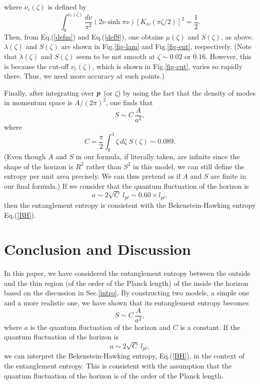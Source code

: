 where $\nu_c(\zeta)$ is defined by
\begin{equation}
\int^{\nu_c(\zeta)}_0 \frac{d\nu}{\pi^2}(2\nu\sinh\pi\nu) 
    \left[K_{i\nu}(\pi\zeta/2)\right]^2=\frac{1}{2}.
\end{equation}
Then, from Eq.(\ref{defm}) and Eq.(\ref{defS}),
one obtains $\mu(\zeta)$ and $S(\zeta)$, as above.
$\lambda(\zeta)$ and $S(\zeta)$
are shown in Fig.\ref{fig-lam} and Fig.\ref{fig-ent},
respectively.
(Note that $\lambda(\zeta)$ and $S(\zeta)$
seem to be not smooth at $\zeta\sim0.02$ or $0.16$.
However, this is because the cut-off $\nu_c(\zeta)$,
which is shown in Fig.\ref{fig-cut}, varies
so rapidly there.
Thus, we need more accuracy at such points.)

Finally, after integrating over $\mbox{\boldmath $p$}$ (or $\zeta$)
by using the fact that the density of modes in
momentum space is $A/(2\pi)^2$,
one finds that
\begin{equation}
  S\sim C\,\frac{A}{a^2},
\end{equation}
where
\begin{equation}
  C=\frac{\pi}{2}\int^1_0 
    \zeta\, d\zeta \;S(\zeta)\sim 0.089.
\end{equation}
(Even though $A$ and $S$ in our formula,
if literally taken, are infinite since
the shape of the horizon is $R^2$ rather than
$S^2$ in this model, we can still define the
entropy per unit area precisely.
We can thus pretend as if $A$ and $S$ are finite
in our final formula.)
If we consider that the quantum fluctuation of the horizon is
\begin{equation}
  a \sim 2\sqrt{C}\; l_{pl} \sim 0.60 \times l_{pl} ,
\end{equation}
then the entanglement entropy is consistent with 
the Bekenstein-Hawking entropy Eq.(\ref{BH}).

\section{Conclusion and Discussion}
\label{conclude}
In this paper, we have considered
the entanglement entropy between
the outside and the thin region
(of the order of the Planck length)
of the inside the horizon
based on the discussion in Sec.\ref{intro}.
By constructing two models, a simple one and a more realistic one,
we have shown that its entanglement entropy becomes
\begin{equation}
 S\sim C\,\frac{A}{a^2},
\end{equation}
where $a$ is the quantum fluctuation of the horizon and
$C$ is a constant.
If the quantum fluctuation of the horizon is
\begin{equation}
  a \sim 2\sqrt{C}\; l_{pl},
\end{equation}
we can interpret the Bekenstein-Hawking entropy, Eq.(\ref{BH}),
in the context of the entanglement entropy.
This is consistent with the assumption that
the quantum fluctuation of the horizon
is of the order of the Planck length.


